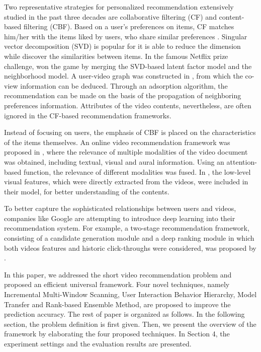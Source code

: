 \documentclass{article}
\begin{document}
Two representative strategies for personalized recommendation extensively studied in the past three decades are collaborative filtering (CF) and content-based filtering (CBF). Based on a user's preferences on items, CF matches him/her with the items liked by users, who share similar preferences \cite{sarwar_item-based_2001}. Singular vector decomposition (SVD) is popular for it is able to reduce the dimension while discover the similarities between items. In the famous Netflix prize challenge, \cite{koren_factorization_2008} won the game by merging the SVD-based latent factor model and the neighborhood model. A user-video graph was constructed in \cite{baluja_video_2008}, from which the co-view information can be deduced. Through an adsorption algorithm, the recommendation can be made on the basis of the propagation of neighboring preferences information. Attributes of the video contents, nevertheless, are often ignored in the CF-based recommendation frameworks.

Instead of focusing on users, the emphasis of CBF is placed on the characteristics of the items themselves. An online video recommendation framework was proposed in \cite{yang_online_2007,mei_videoreach:_2007}, where the relevance of multiple modalities of the video document was obtained, including textual, visual and aural information. Using an attention-based function, the relevance of different modalities was fused. In \cite{deldjoo_toward_2015}, the low-level visual features, which were directly extracted from the videos, were included in their model, for better understanding of the contents. 

To better capture the sophisticated relationships between users and videos, companies like Google are attempting to introduce deep learning into their recommendation system. For example, a two-stage recommendation framework, consisting of a candidate generation module and a deep ranking module in which both videos features and historic click-throughs were considered, was proposed by \cite{covington_deep_2016}.

In this paper, we addressed the short video recommendation problem and proposed an efficient universal framework. Four novel techniques, namely Incremental Multi-Window Scanning, User Interaction Behavior Hierarchy, Model Transfer and Rank-based Ensemble Method, are proposed to improve the prediction accuracy. The rest of paper is organized as follows. In the following section, the problem definition is first given. Then, we present the overview of the framework by elaborating the four proposed techniques. In Section 4, the experiment settings and the evaluation results are presented.
\end{document}
